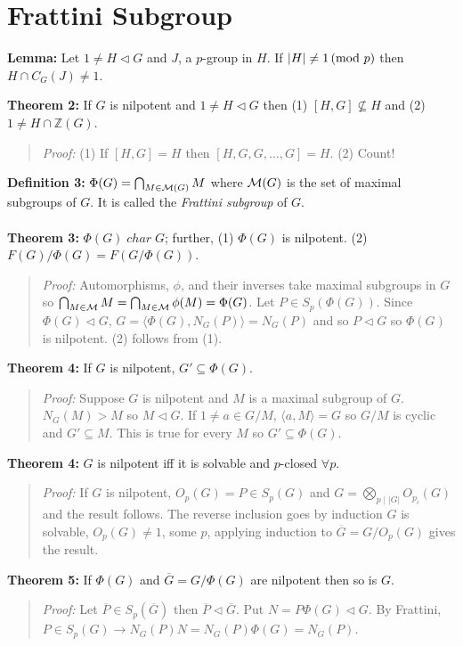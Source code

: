 \section{Frattini Subgroup}
{\bf Lemma:} Let $1 \ne H \lhd G$ and $J$, a $p$-group in $H$.  If $|H| \neq 1 \thinspace \textnormal{(mod } p \textnormal{)}$ then
$H \cap C_G(J) \neq 1$.
\begin{quote}
\end{quote}
{\bf Theorem 2:} If $G$ is nilpotent and $1 \ne H \lhd G$ then (1) $[H,G] \nsubseteq H$ and
(2) $1 \ne H \cap {\mathbb Z}(G)$.
\begin{quote}
\emph{Proof:} (1) If $[H,G]=H$ then $[H, G, G, \ldots, G]=H$. (2) Count!
\end{quote}
{\bf Definition 3:} $\Phi(G)= \bigcap_{M \in {\cal M}(G)} M$ where ${\cal M}(G)$ is the set of
maximal subgroups of $G$.  
It is called the \emph {Frattini subgroup} of $G$.  
\\
\\
{\bf Theorem 3:} 
$\Phi(G) \; char \; G$; further,
(1) $\Phi(G)$ is nilpotent. (2)
$F(G)/\Phi(G)= F(G/\Phi(G))$.
\begin{quote}
\emph{Proof:}  
Automorphisms, $\phi$, and their inverses take maximal subgroups in $G$ so 
$ \bigcap_{M \in {\cal M}} M = \bigcap_{M \in {\cal M}} \phi(M)= \Phi(G)$.
Let $P \in S_p(\Phi(G))$.  Since $\Phi(G) \lhd G$, $G= \langle \Phi(G), N_G(P) \rangle = N_G(P)$ and so
$P \lhd G$ so $\Phi(G)$ is nilpotent.  (2) follows from (1).
\end{quote}
{\bf Theorem 4:} If $G$ is nilpotent, $G' \subseteq \Phi(G)$.
\begin{quote}
\emph{Proof:}  Suppose $G$ is nilpotent and $M$ is a maximal subgroup of $G$.
$N_G(M)>M$ so $M \lhd G$.  If $1 \ne a \in G/M$, $ \langle a, M \rangle = G$ so $G/M$ is cyclic and
$G' \subseteq M$.  This is true for every $M$ so $G' \subseteq \Phi(G)$.
\end{quote}
{\bf Theorem 4:} $G$ is nilpotent iff it is solvable and $p$-closed $\forall p$.
\begin{quote}
\emph{Proof:} If $G$ is nilpotent, $O_p(G) = P \in S_p(G)$ and $G= \bigotimes_{p \mid |G|} O_{p_i}(G)$ and the result follows.
The reverse inclusion goes by induction $G$ is solvable, $O_p(G) \neq 1$, some $p$, applying induction to ${\overline G}=
G/O_p(G)$ gives the result.
\end{quote}
{\bf Theorem 5:} If $\Phi(G)$ and ${\overline G}= G/\Phi(G)$ are nilpotent then so is $G$.
\begin{quote}
\emph{Proof:} Let ${\overline P} \in S_p({\overline G})$ then ${\overline P} \lhd {\overline G}$.
Put $N= P \Phi(G) \lhd G$.  
By Frattini, $P \in S_p(G) \rightarrow N_G(P)N= N_G(P) \Phi(G)= N_G(P)$.
\end{quote}

